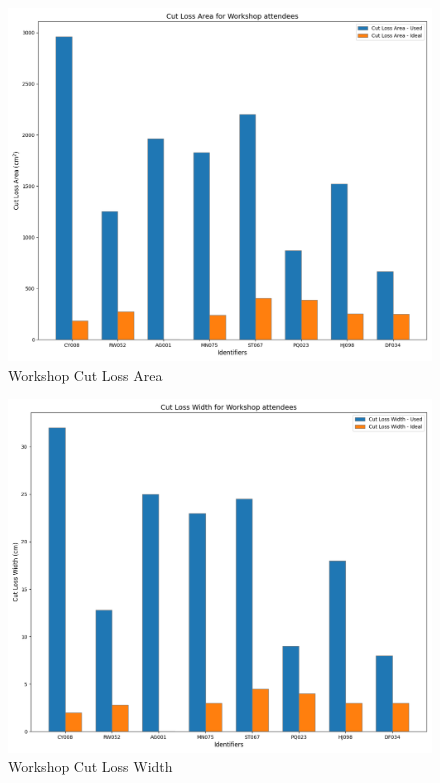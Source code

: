 \begin{figure} [htb]
    \centering
    \includegraphics[width = \textwidth]{Images/Workshop_CutLossArea_Bar.png}
    \caption{Workshop Cut Loss Area}
\end{figure}
\begin{figure} [htb]
    \centering
    \includegraphics[width = \textwidth]{Images/Workshop_CutLossWidth_Bar.png}
    \caption{Workshop Cut Loss Width}
\end{figure}
